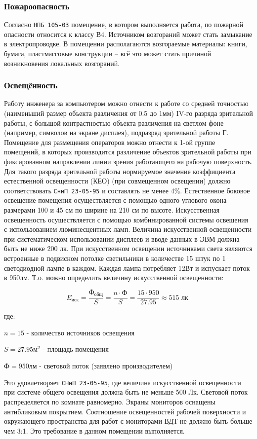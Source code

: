 \subsubsection{Пожароопасность}
Согласно \verb|НПБ 105-03| помещение, в котором выполняется работа,
по пожарной опасности относится к классу В4. Источником возгораний
может стать замыкание в электропроводке. В помещении располагаются
возгораемые материалы: книги, бумага, пластмассовые конструкции --
всё это может стать причиной возникновения локальных возгораний. 

\subsubsection{Освещённость}
Работу инженера за компьютером можно отнести к работе со средней
точностью (наименьший размер объекта различения от 0.5 до 1мм)
IV-го разряда зрительной работы, с большой контрастностью объекта
различения на светлом фоне (например, символов на экране дисплея),
подразряд зрительной работы Г. Помещение для размещения операторов
можно отнести к 1-ой группе помещений, в которых производится
различение объектов зрительной работы при фиксированном направлении
линии зрения работающего на рабочую поверхность. Для такого разряда
зрительной работы нормируемое значение коэффициента естественной
освещенности (КЕО) (при совмещенном освещении) должно соответствовать
\verb|СниП 23-05-95| и составлять не менее 4\%.
Естественное боковое освещение помещения осуществляется с
помощью одного углового окона размерами 100 и 45 см по ширине на 210 см по высоте.
Искусственная освещенность осуществляется с помощью комбинированной системы
освещения с использованием люминесцентных ламп. Величина искусственной
освещенности при систематическом использовании дисплеев и вводе
данных в ЭВМ должна быть не ниже 200 лк.
При искусственном освещении источниками света являются встроенные
в подвисном потолке светильники в количестве 15 штук по 1 светодиодной
лампе в каждом. Каждая лампа потребляет 12Вт и испускает поток в 950лм.
Т.о. можно определить величину искусственной освещенности:

$$ E_\text{иск} = \frac{\text{Ф}_\text{общ}}{S} = \frac{n \cdot \text{Ф}}{S} =
\frac{15 \cdot 950}{27.95} \approx 515 \text{ лк } $$

где: 
\begin{mintemize}
    \item $n = 15$ - количество источников освещения
    \item $S = 27.95 \text{м}^2$ - площадь помещения
    \item $\text{Ф} = 950 \text{лм}$ - световой поток (заявлено производителем)
\end{mintemize}

Это удовлетворяет \verb|СНиП 23-05-95|, где величина искусственной
освещенности при системе общего освещения должна быть не меньше 500 Лк.
Световой поток распределяется по комнате равномерно. Экраны мониторов
оснащены антибликовым покрытием. Соотношение освещенностей рабочей
поверхности и окружающего пространства для работ с мониторами ВДТ
не должно быть больше чем 3:1. Это требование в данном помещении выполняется.
